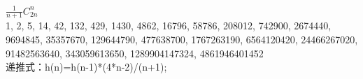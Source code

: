 $\frac{1}{n+1}C^n_{2n}$ \\
1, 2, 5, 14, 42, 132, 429, 1430, 4862, 16796, 58786, 208012, 742900, 2674440, 9694845, 35357670, 129644790, 477638700, 1767263190, 6564120420, 24466267020, 91482563640, 343059613650, 1289904147324, 4861946401452 \\
递推式：h(n)=h(n-1)*(4*n-2)/(n+1); \\